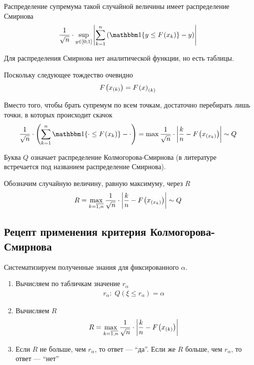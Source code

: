 Распределение супремума такой случайной величины имеет распределение Смирнова
\begin{align*}
    \frac{1}{\sqrt{n}} \cdot \sup\limits_{y \in \left[ 0; 1 \right]}
        {\left| \sum_{k=1}^{n} \left( \Indicator{y \le \cdf{x_k}} - y  \right)
        \right|}
\end{align*}

Для распределения Смирнова нет аналитической функции, но есть таблицы.

Поскольку следующее тождество очевидно
\begin{align*}
    F_{}\left(x_{\left( k \right)}\right) = F_{}\left(x\right)_{\left( k \right)}
\end{align*}

Вместо того, чтобы брать супремум по всем точкам, достаточно перебирать лишь
точки, в которых происходит скачок
\begin{align*}
    \frac{1}{\sqrt{n}} \cdot \left(
        \sum_{k=1}^{n}\Indicator{\cdot \le \cdf{x_k}} - \cdot \right)
    = \max{\frac{1}{\sqrt{n}} \cdot \left| \frac{k}{n}
        - \cdf{x_{\left( x_k \right)}} \right|}
    \sim Q
\end{align*}

Буква $Q$ означает распределение Колмогорова-Смирнова (в литературе встречается
под названием распределение Смирнова).

Обозначим случайную величину, равную максимуму, через $R$
\begin{align*}
    R = \max\limits_{k=\overline{1,n}}{
        \frac{1}{\sqrt{n}} \cdot \left| \frac{k}{n}
            - F_{}\left(x_{\left( x_k \right)}\right) \right|}
    \sim Q
\end{align*}

\subsection{Рецепт применения критерия Колмогорова-Смирнова}

Систематизируем полученные знания для фиксированного $\alpha$.

\begin{enumerate}
    \item Вычисляем по табличкам значение $r_{\alpha}$
        \begin{align*}
            r_{\alpha}:\; Q\left( \xi \le r_{\alpha} \right) = \alpha
        \end{align*}
    \item Вычисляем $R$
        \begin{align*}
            R = \max\limits_{k=\overline{1,n}}{
                \frac{1}{\sqrt{n}} \cdot \left| \frac{k}{n}
                    - F_{}\left(x_{\left( k \right)}\right) \right|}
        \end{align*}
    \item Если $R$ не больше, чем $r_{\alpha}$, то ответ --- ``да''.
        Если же $R$ больше, чем $r_{\alpha}$, то ответ --- ``нет''
\end{enumerate}


